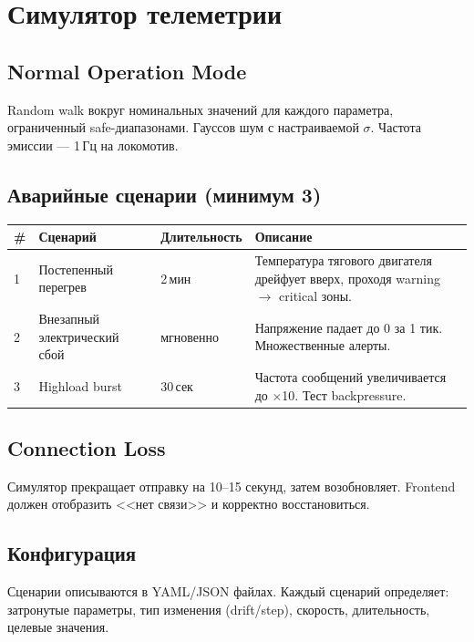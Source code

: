 \documentclass[12pt,a4paper]{article}
\begin{document}
\section{Симулятор телеметрии}

\subsection{Normal Operation Mode}

Random walk вокруг номинальных значений для каждого параметра, ограниченный safe-диапазонами. Гауссов шум с настраиваемой $\sigma$. Частота эмиссии --- 1\,Гц на локомотив.

\subsection{Аварийные сценарии (минимум 3)}

\begin{tabularx}{\textwidth}{C{0.6cm} l C{1.5cm} X}
\toprule
\textbf{\#} & \textbf{Сценарий} & \textbf{Длительность} & \textbf{Описание} \\
 & Постепенный перегрев & 2\,мин & Температура тягового двигателя дрейфует вверх, проходя warning $\to$ critical зоны. \\
2 & Внезапный электрический сбой & мгновенно & Напряжение падает до 0 за 1 тик. Множественные алерты. \\
3 & Highload burst & 30\,сек & Частота сообщений увеличивается до $\times$10. Тест backpressure. \\
\bottomrule
\end{tabularx}

\subsection{Connection Loss}

Симулятор прекращает отправку на 10--15 секунд, затем возобновляет. Frontend должен отобразить <<нет связи>> и корректно восстановиться.

\subsection{Конфигурация}

Сценарии описываются в YAML/JSON файлах. Каждый сценарий определяет: затронутые параметры, тип изменения (drift/step), скорость, длительность, целевые значения.


\end{document}

